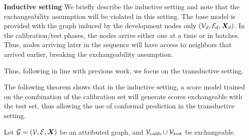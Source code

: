 \noindent \textbf{Inductive setting}
We briefly describe the inductive setting and note that the exchangeability assumption will be violated in this setting.
The base model is provided with the graph induced by the development nodes only $({\mathcal{V}}_d, {\mathcal{E}}_d, {\bm{X}}_d)$.
In the calibration/test phases, the nodes arrive either one at a time or in batches.
Thus, nodes arriving later in the sequence will have access to neighbors that arrived earlier, breaking the exchangeability assumption.

Thus, following in line with previous work, we focus on the transductive setting.

The following theorem shows that in the inductive setting, a score model trained on the combination of the calibration set will generate scores exchangeable with the test set, thus allowing the use of conformal prediction in the transductive setting.

\begin{theorem}
    Let ${\mathcal{G}} = ({\mathcal{V}}, {\mathcal{E}}, {\bm{X}})$ be an attributed graph, and ${\mathcal{V}}_{\text{calib}} \cup {\mathcal{V}}_{\text{test}}$ be exchangeable.
    \label{thm:exchangeability}
\end{theorem}


%
